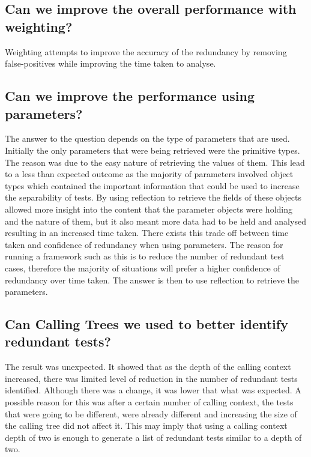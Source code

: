 \subsection{Can we improve the overall performance with weighting?}
Weighting attempts to improve the accuracy of the redundancy by removing false-positives while improving the time taken to analyse. 


\subsection{Can we improve the performance using parameters?}

The answer to the question depends on the type of parameters that are used. Initially the only parameters that were being retrieved were the primitive types. The reason was due to the easy nature of retrieving the values of them. This lead to a less than expected outcome as the majority of parameters involved object types which contained the important information that could be used to increase the separability of tests. By using reflection to retrieve the fields of these objects allowed more insight into the content that the parameter objects were holding and the nature of them, but it also meant more data had to be held and analysed resulting in an increased time taken. There exists this trade off between time taken and confidence of redundancy when using parameters. The reason for running a framework such as this is to reduce the number of redundant test cases, therefore the majority of situations will prefer a higher confidence of redundancy over time taken. The answer is then to use reflection to retrieve the parameters.


\subsection{Can Calling Trees we used to better identify redundant tests?}

The result was unexpected. It showed that as the depth of the calling context increased, there was limited level of reduction in the number of redundant tests identified. Although there was a change, it was lower that what was expected. A possible reason for this was after a certain number of calling context, the tests that were going to be different, were already different and increasing the size of the calling tree did not affect it. This may imply that using a calling context depth of two is enough to generate a list of redundant tests similar to a depth of two. 

